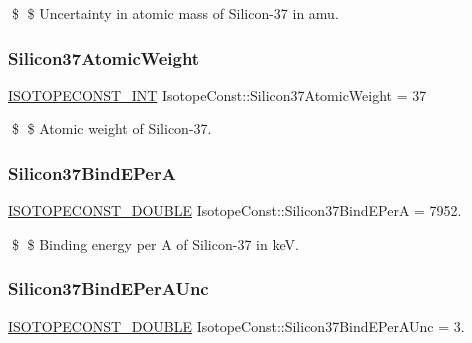 \$ \$ Uncertainty in atomic mass of Silicon-\/37 in amu. \mbox{\label{group___isotope_const-_silicon-_si37_ga1fb0ed182f69b8a6fbfccf304afa9d38}} 
\subsubsection{\texorpdfstring{Silicon37\+Atomic\+Weight}{Silicon37AtomicWeight}}
{\footnotesize\ttfamily \mbox{\hyperlink{group___isotope_const-_macros_ga5f18360b3e99483a35c32d789e62621c}{I\+S\+O\+T\+O\+P\+E\+C\+O\+N\+S\+T\+\_\+\+I\+NT}} Isotope\+Const\+::\+Silicon37\+Atomic\+Weight = 37}

\$ \$ Atomic weight of Silicon-\/37. \mbox{\label{group___isotope_const-_silicon-_si37_ga470f3898c28f4572a290149f734b4290}} 
\subsubsection{\texorpdfstring{Silicon37\+Bind\+E\+PerA}{Silicon37BindEPerA}}
{\footnotesize\ttfamily \mbox{\hyperlink{group___isotope_const-_macros_ga8f45a7272ce02c0b4c65c44636ed719a}{I\+S\+O\+T\+O\+P\+E\+C\+O\+N\+S\+T\+\_\+\+D\+O\+U\+B\+LE}} Isotope\+Const\+::\+Silicon37\+Bind\+E\+PerA = 7952.}

\$ \$ Binding energy per A of Silicon-\/37 in keV. \mbox{\label{group___isotope_const-_silicon-_si37_ga7ba584627ac84273ca8ce7412207b3e1}} 
\subsubsection{\texorpdfstring{Silicon37\+Bind\+E\+Per\+A\+Unc}{Silicon37BindEPerAUnc}}
{\footnotesize\ttfamily \mbox{\hyperlink{group___isotope_const-_macros_ga8f45a7272ce02c0b4c65c44636ed719a}{I\+S\+O\+T\+O\+P\+E\+C\+O\+N\+S\+T\+\_\+\+D\+O\+U\+B\+LE}} Isotope\+Const\+::\+Silicon37\+Bind\+E\+Per\+A\+Unc = 3.}

